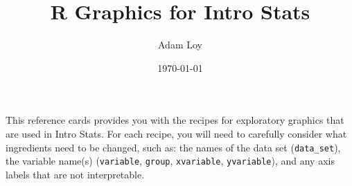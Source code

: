 \documentclass[10pt]{report}\usepackage[]{graphicx}\usepackage[]{color}
\title{R Graphics for Intro Stats}
\author{
Adam Loy
}
\date{\today}
\begin{document}
\parindent=0pt





\let\oldchapter=\chapter
\def\chapter{\setcounter{page}{1}\oldchapter}



\def\opt#1{#1}
\def\squeeze{\vspace*{-4ex}}


This reference cards provides you with the recipes for exploratory graphics that are used in Intro Stats. For each recipe, you will need to carefully consider what ingredients need to be changed, such as: the names of the data set (\texttt{data\_set}), the variable name(s) (\texttt{variable}, \texttt{group}, \texttt{xvariable}, \texttt{yvariable}), and any axis labels that are not interpretable.
\end{document}
